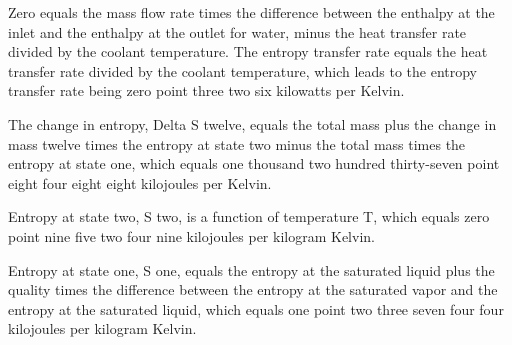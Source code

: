 Zero equals the mass flow rate times the difference between the enthalpy at the inlet and the enthalpy at the outlet for water, minus the heat transfer rate divided by the coolant temperature. The entropy transfer rate equals the heat transfer rate divided by the coolant temperature, which leads to the entropy transfer rate being zero point three two six kilowatts per Kelvin.

The change in entropy, Delta S twelve, equals the total mass plus the change in mass twelve times the entropy at state two minus the total mass times the entropy at state one, which equals one thousand two hundred thirty-seven point eight four eight eight kilojoules per Kelvin.

Entropy at state two, S two, is a function of temperature T, which equals zero point nine five two four nine kilojoules per kilogram Kelvin.

Entropy at state one, S one, equals the entropy at the saturated liquid plus the quality times the difference between the entropy at the saturated vapor and the entropy at the saturated liquid, which equals one point two three seven four four kilojoules per kilogram Kelvin.